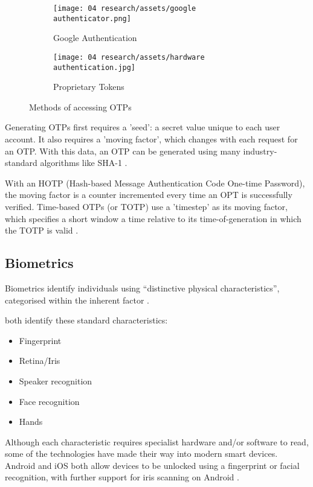 \begin{figure}[H]
  \centering
  \begin{subfigure}{0.49\linewidth}
    \centering
    \texttt{[image: 04
      research/assets/google authenticator.png]}
    \caption{Google Authentication}
    \parencite{img:googleAuth}
  \end{subfigure}
  \begin{subfigure}{0.49\linewidth}
    \centering
    \texttt{[image: 04
      research/assets/hardware authentication.jpg]}
    \caption{Proprietary Tokens}
    \parencite{img:authToken}
  \end{subfigure}

  \caption{Methods of accessing OTPs}
\end{figure}

Generating OTPs first requires a 'seed': a secret value
unique to each user account.
It also requires a 'moving factor', which changes with each
request for an OTP.
With this data, an OTP can be generated using many
industry-standard algorithms like SHA-1
\parencite{whatIsOtp}.

With an HOTP (Hash-based Message Authentication Code
One-time Password), the moving factor is a counter
incremented every time an OPT is successfully verified.
Time-based OTPs (or TOTP) use a 'timestep' as its moving
factor, which specifies a short window a time relative to
its time-of-generation in which the TOTP is valid
\parencite{whatIsOtp}.

\subsection{Biometrics}

Biometrics identify individuals using \enquote{distinctive
  physical characteristics}, categorised within the inherent
factor \parencite{surveyOnAuthFactors}.

\cite{evalOfAuthMethods,
  surveyOnAuthFactors} both identify these
standard characteristics:

\begin{itemize}
  \item Fingerprint
  \item Retina/Iris
  \item Speaker recognition
  \item Face recognition
  \item Hands
\end{itemize}

Although each characteristic requires specialist hardware
and/or software to read, some of the technologies have made
their way into modern smart devices.
Android and iOS both allow devices to be unlocked using a
fingerprint or facial recognition, with further support for
iris scanning on Android \parencite{androidBiometrics,
  touchId, faceId}.